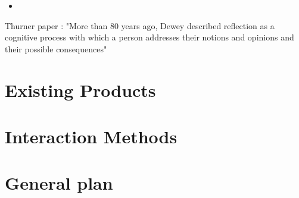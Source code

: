 \documentclass{l4proj}
\begin{document}
\begin{itemize}
    \item 
\end{itemize}

Thurner paper : "More than 80 years ago, Dewey described reflection as a cognitive process with which a person addresses their notions and opinions 
and their possible consequences"

\section{Existing Products}

\section{Interaction Methods}

\section{}

\section{General plan}
\end{document}
